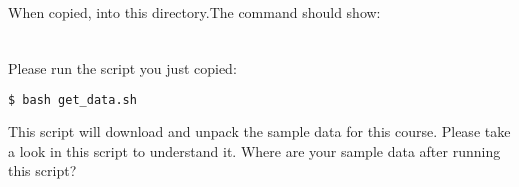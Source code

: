 \begin{frame}[fragile]
  \frametitle{}
  \begin{columns}[t]
	 \begin{column}{.5\textwidth}
		When copied,  into this directory.\newline The command  should show:
	 \end{column}
	 \begin{column}{.5\textwidth}
	   \begin{minipage}[t]{0.5\textwidth}
		 {\footnotesize \DTsetlength{0.2em}{1em}{0.2em}{0.4pt}{.6pt}
			 }
      \end{minipage}
	\end{column}
  \end{columns}
\end{frame}

\begin{frame}[fragile]
  \frametitle{}
  Please run the  script you just copied:
  \begin{lstlisting}[language=Bash, style=Shell,basicstyle=\footnotesize]
$ bash get_data.sh
  \end{lstlisting}
  \begin{task}
  	This script will download and unpack the sample data for this course. Please take a look in this script to understand it. Where are your sample data after running this script?
  \end{task}
\end{frame}